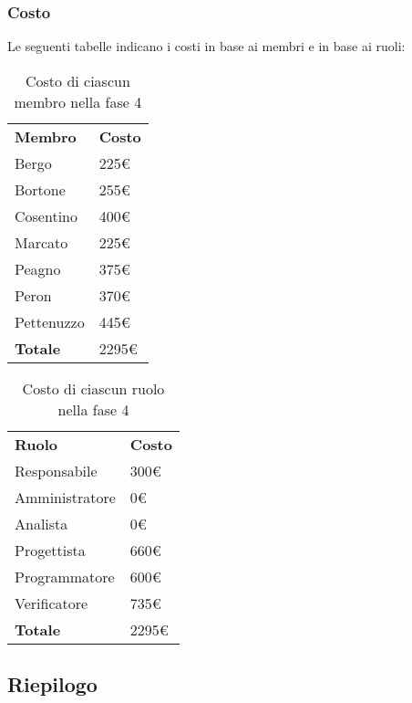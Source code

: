 	\subsubsection{Costo}
		Le seguenti tabelle indicano i costi in base ai membri e in base ai ruoli:
		\begin{table}[h]
			\centering
			\begin{tabular}{| l | l |}
				\rowcolor{LightBlue}
				\textbf{\color{white}Membro}
				& \textbf{\color{white}Costo}\\
				
				Bergo				& 225€\\
				Bortone			& 255€\\
				Cosentino		& 400€\\
				Marcato			& 225€\\
				Peagno				& 375€\\
				Peron				& 370€\\
				Pettenuzzo		& 445€\\ \hline
				\textbf{Totale} & 2295€\\ \hline
			\end{tabular}
			\caption{Costo di ciascun membro nella fase 4}
		\end{table}
		
		\begin{table}[h]
			\centering
			\begin{tabular}{| l | l |}
				\rowcolor{LightBlue}
				\textbf{\color{white}Ruolo}
				& \textbf{\color{white}Costo}\\
				
				Responsabile 		& 300€\\
				Amministratore 	& 0€\\
				Analista 				& 0€\\			
				Progettista 			& 660€\\
				Programmatore 		& 600€\\
				Verificatore 		& 735€\\ \hline
				\textbf{Totale} 	& 2295€\\ \hline
			\end{tabular}		
			\caption{Costo di ciascun ruolo nella fase 4}
		\end{table}

\newpage
\subsection{Riepilogo}
